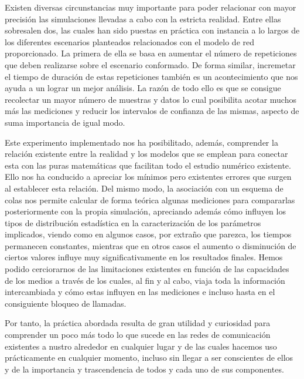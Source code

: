 \documentclass{article}[10pt]
\begin{document}
		Existen diversas circunstancias muy importante para poder relacionar con mayor precisión las simulaciones llevadas a cabo con la estricta realidad. Entre ellas sobresalen dos, las cuales han sido puestas en práctica con instancia a lo largos de los diferentes escenarios planteados relacionados con el modelo de red proporcionado. La primera de ella se basa en aumentar el número de repeticiones que deben realizarse sobre el escenario conformado. De forma similar, incremetar el tiempo de duración de estas repeticiones también es un acontecimiento que nos ayuda a un lograr un mejor análisis. La razón de todo ello es que se consigue recolectar un mayor número de muestras y datos lo cual posibilita acotar muchos más las mediciones y reducir los intervalos de confianza de las mismas, aspecto de suma importancia de igual modo.

		Este experimento implementado nos ha posibilitado, además, comprender la relación existente entre la realidad y los modelos que se emplean para conectar esta con las puras matemáticas que facilitan todo el estudio numérico existente. Ello nos ha conducido a apreciar los mínimos pero existentes errores que surgen al establecer esta relación. Del mismo modo, la asociación con un esquema de colas nos permite calcular de forma teórica algunas mediciones para compararlas posteriormente con la propia simulación, apreciando además cómo influyen los tipos de distribución estadística en la caracterización de los parámetros implicados, viendo como en algunos casos, por extraño que parezca, los tiempos permanecen constantes, mientras que en otros casos el aumento o disminución de ciertos valores influye muy significativamente en los resultados finales. Hemos podido cerciorarnos de las limitaciones existentes en función de las capacidades de los medios a través de los cuales, al fin y al cabo, viaja toda la información intercambiada y cómo estas influyen en las mediciones e incluso hasta en el consiguiente bloqueo de llamadas.

		Por tanto, la práctica abordada resulta de gran utilidad y curiosidad para comprender un poco más todo lo que sucede en las redes de comunicación existentes a nustro alrededor en cualquier lugar y de las cuales hacemos uso prácticamente en cualquier momento, incluso sin llegar a ser conscientes de ellos y de la importancia y trascendencia de todos y cada uno de sus componentes.
\end{document}
